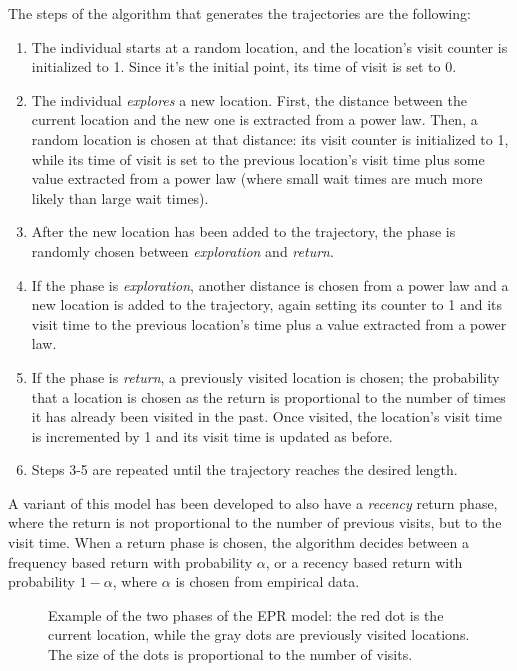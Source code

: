 The steps of the algorithm that generates the trajectories are the following:
\begin{enumerate}
    \item The individual starts at a random location, and the location's visit counter is initialized to 1. Since it's the initial point, its time of visit is set to 0.
    \item The individual \textit{explores} a new location. First, the distance between the current location and the new one is extracted from a power law. Then, a random location is chosen at that distance: its visit counter is initialized to 1, while its time of visit is set to the previous location's visit time plus some value extracted from a power law (where small wait times are much more likely than large wait times).
    \item After the new location has been added to the trajectory, the phase is randomly chosen between \textit{exploration} and \textit{return}.
    \item If the phase is \textit{exploration}, another distance is chosen from a power law and a new location is added to the trajectory, again setting its counter to 1 and its visit time to the previous location's time plus a value extracted from a power law.
    \item If the phase is \textit{return}, a previously visited location is chosen; the probability that a location is chosen as the return is proportional to the number of times it has already been visited in the past. Once visited, the location's visit time is incremented by 1 and its visit time is updated as before.
    \item Steps 3-5 are repeated until the trajectory reaches the desired length.
\end{enumerate}
A variant of this model has been developed to also have a \textit{recency} return phase, where the return is not proportional to the number of previous visits, but to the visit time. When a return phase is chosen, the algorithm decides between a frequency based return with probability $\alpha$, or a recency based return with probability $1 - \alpha$, where $\alpha$ is chosen from empirical data.
\begin{figure}[H]
    \centering
    
    \caption{Example of the two phases of the EPR model: the red dot is the current location, while the gray dots are previously visited locations. The size of the dots is proportional to the number of visits.}
\end{figure}

